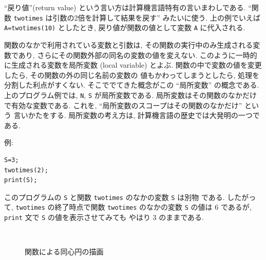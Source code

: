 \documentclass{jbook}
\begin{document}
``戻り値''(return value) という言い方は計算機言語特有の言いまわしである.
``関数 {\tt twotimes} は引数の2倍を計算して結果を戻す'' みたいに使う.
上の例でいえば {\tt A=twotimes(10)} としたとき,
戻り値が関数の値として変数 {\tt A} に代入される.


関数のなかで利用されている変数と引数は,
その関数の実行中のみ生成される変数であり,
さらにその関数外部の同名の変数の値を変えない.
このように一時的に生成される変数を局所変数 (local variable) とよぶ.
関数の中で変数の値を変更したら, その関数の外の同じ名前の変数の
値もかわってしまうとしたら, 処理を分割した利点がすくない.
そこででてきた概念がこの ``局所変数''
の概念である.
上のプログラム例では,
{\tt N}, {\tt S} が局所変数である.
局所変数はその関数のなかだけで有効な変数である.
これを, ``局所変数のスコープはその関数のなかだけ'' という
言いかたをする. 
局所変数の考え方は, 計算機言語の歴史では大発明の一つである.

\noindent
例:
\begin{flushleft}
\begin{minipage}[t]{7cm}
\begin{screen}
\begin{verbatim}
S=3;
twotimes(2);
print(S);
\end{verbatim}
\end{screen}
\end{minipage} \quad
%
\begin{minipage}[t]{7cm}
このプログラムの {\tt S} と関数 {\tt twotimes} のなかの変数  {\tt S} は別物
である.
したがって, {\tt twotimes} の終了時点で関数 {\tt twotimes} のなかの変数 {\tt S}
の値は $6$ であるが,  {\tt print} 文で {\tt S} の値を表示させてみても
やはり $3$ のままである.
\end{minipage} \\
\end{flushleft}


\begin{figure}[tbh]
\caption{ 関数による同心円の描画} \label{fig:circleFunc}
\end{figure}
\end{document}

